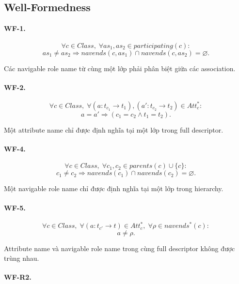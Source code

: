 \documentclass[12pt,a4paper]{article}
\theoremstyle{definition}
\begin{document}
\subsection{Well-Formedness}

\paragraph{WF-1.}

\[
\forall c\in Class,\;
\forall as_1,as_2\in participating(c):
\]
\[
as_1\neq as_2
\Rightarrow
navends(c,as_1)\cap navends(c,as_2)
=
\varnothing.
\tag{WF-1}
\]

Các navigable role name từ cùng một lớp phải phân biệt giữa các association.


\paragraph{WF-2.}

\[
\forall c\in Class,\;
\forall
(a:t_{c_1}\to t_1),
(a':t_{c_2}\to t_2)
\in Att_c^{*}:
\]
\[
a=a'
\Rightarrow
(c_1=c_2\land t_1=t_2).
\tag{WF-2}
\]

Một attribute name chỉ được định nghĩa tại một lớp trong full descriptor.




\paragraph{WF-4.}

\[
\forall c\in Class,\;
\forall c_1,c_2\in parents(c)\cup\{c\}:
\]
\[
c_1\neq c_2
\Rightarrow
navends(c_1)\cap navends(c_2)
=
\varnothing.
\tag{WF-4}
\]

Một navigable role name chỉ được định nghĩa tại một lớp trong hierarchy.


\paragraph{WF-5.}

\[
\forall c\in Class,\;
\forall(a:t_{c'}\to t)\in Att_c^{*},\;
\forall \rho\in navends^{*}(c):
\]
\[
a\neq \rho.
\tag{WF-5}
\]

Attribute name và navigable role name trong cùng full descriptor không được trùng nhau.

\paragraph{WF-R2.}
\end{document}
